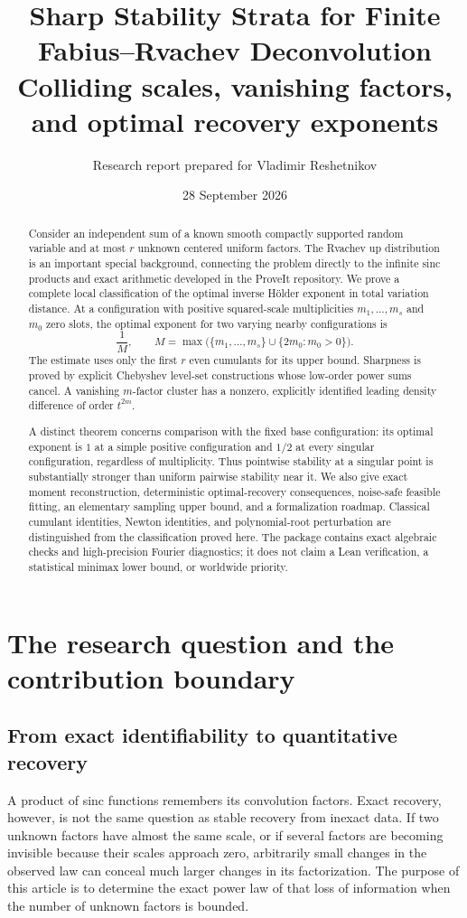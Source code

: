 \documentclass[11pt,a4paper]{article}
\title{\textbf{Sharp Stability Strata for Finite\\Fabius--Rvachev Deconvolution}\\[0.6em]
\large Colliding scales, vanishing factors, and optimal recovery exponents}
\author{Research report prepared for Vladimir Reshetnikov}
\date{28 September 2026}
\numberwithin{equation}{section}
\theoremstyle{definition}
\theoremstyle{remark}
\begin{document}
\maketitle
\begin{abstract}
Consider an independent sum of a known smooth compactly supported random variable
and at most $r$ unknown centered uniform factors.  The Rvachev up distribution is
an important special background, connecting the problem directly to the infinite
sinc products and exact arithmetic developed in the ProveIt repository.  We prove
a complete local classification of the optimal inverse H\"older exponent in total
variation distance.  At a configuration with positive squared-scale multiplicities
$m_1,\ldots,m_s$ and $m_0$ zero slots, the optimal exponent for two varying nearby
configurations is
\[
 \frac1M,\qquad M=\max\bigl(\{m_1,\ldots,m_s\}\cup
             \{2m_0:m_0>0\}\bigr).
\]
The estimate uses only the first $r$ even cumulants for its upper bound.  Sharpness
is proved by explicit Chebyshev level-set constructions whose low-order power
sums cancel.  A vanishing $m$-factor cluster has a nonzero, explicitly identified
leading density difference of order $t^{2m}$.

A distinct theorem concerns comparison with the fixed base configuration: its
optimal exponent is $1$ at a simple positive configuration and $1/2$ at every
singular configuration, regardless of multiplicity.  Thus pointwise stability
at a singular point is substantially stronger than uniform pairwise stability
near it.  We also give exact moment reconstruction, deterministic optimal-recovery
consequences, noise-safe feasible fitting, an elementary sampling upper bound,
and a formalization roadmap.  Classical cumulant identities, Newton identities,
and polynomial-root perturbation are distinguished from the classification
proved here.  The package contains exact algebraic checks and high-precision
Fourier diagnostics; it does not claim a Lean verification, a statistical
minimax lower bound, or worldwide priority.
\end{abstract}
\newpage
\tableofcontents
\newpage

\section{The research question and the contribution boundary}
\label{sec:scope}

\subsection{From exact identifiability to quantitative recovery}
A product of sinc functions remembers its convolution factors.  Exact recovery,
however, is not the same question as stable recovery from inexact data.  If two
unknown factors have almost the same scale, or if several factors are becoming
invisible because their scales approach zero, arbitrarily small changes in the
observed law can conceal much larger changes in its factorization.  The purpose
of this article is to determine the exact power law of that loss of information
when the number of unknown factors is bounded.
\end{document}
